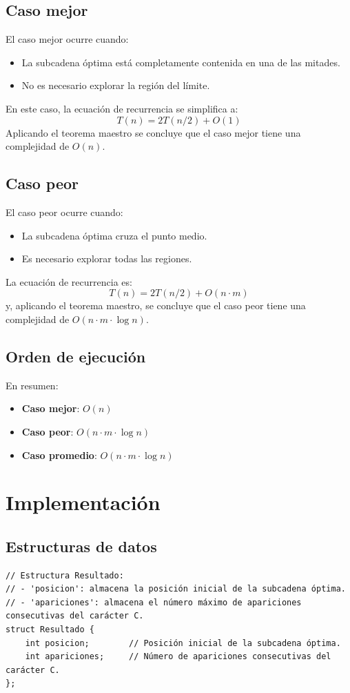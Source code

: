 \documentclass[12pt,a4paper]{article}
\begin{document}
\subsection{Caso mejor}
El caso mejor ocurre cuando:
\begin{itemize}
    \item La subcadena óptima está completamente contenida en una de las mitades.
    \item No es necesario explorar la región del límite.
\end{itemize}
En este caso, la ecuación de recurrencia se simplifica a:
\[
T(n) = 2T(n/2) + O(1)
\]
Aplicando el teorema maestro se concluye que el caso mejor tiene una complejidad de \(O(n)\).

\subsection{Caso peor}
El caso peor ocurre cuando:
\begin{itemize}
    \item La subcadena óptima cruza el punto medio.
    \item Es necesario explorar todas las regiones.
\end{itemize}
La ecuación de recurrencia es:
\[
T(n) = 2T(n/2) + O(n \cdot m)
\]
y, aplicando el teorema maestro, se concluye que el caso peor tiene una complejidad de \(O(n \cdot m \cdot \log n)\).

\subsection{Orden de ejecución}
En resumen:
\begin{itemize}
    \item \textbf{Caso mejor}: \(O(n)\)
    \item \textbf{Caso peor}: \(O(n \cdot m \cdot \log n)\)
    \item \textbf{Caso promedio}: \(O(n \cdot m \cdot \log n)\)
\end{itemize}

\section{Implementación}

\subsection{Estructuras de datos}
\begin{lstlisting}[caption=Estructura Resultado]
// Estructura Resultado:
// - 'posicion': almacena la posición inicial de la subcadena óptima.
// - 'apariciones': almacena el número máximo de apariciones consecutivas del carácter C.
struct Resultado {
    int posicion;        // Posición inicial de la subcadena óptima.
    int apariciones;     // Número de apariciones consecutivas del carácter C.
};
\end{lstlisting}
\end{document}
